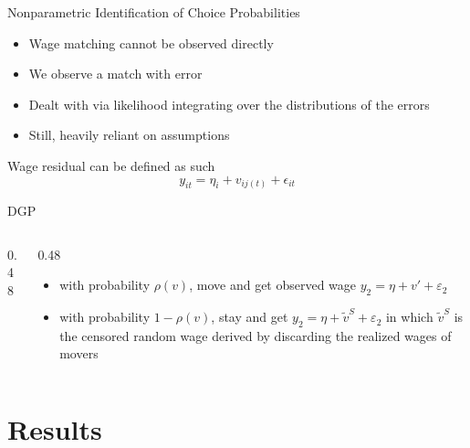 \documentclass[aspectratio=169,professionalfonts]{beamer}
\begin{document}
\begin{frame}{Nonparametric Identification of Choice Probabilities}
  \begin{itemize}
  \item Wage matching cannot be observed directly
  \item We observe a match with error
  \item Dealt with via likelihood integrating over the distributions  of the errors
  \item Still, heavily reliant on assumptions
  \end{itemize}
  Wage residual can be defined as such
  \begin{equation}
    y_{it} = \eta_i + v_{ij(t)}+\epsilon_{it}
  \end{equation}
\end{frame}

\begin{frame}{DGP}
  \begin{columns}[T,onlytextwidth]
    \begin{column}{0.48\linewidth}
    \end{column}
    \begin{column}{0.48\linewidth}
      \begin{itemize}
        \item with probability $\rho(v)$, move and get observed wage $y_2 = \eta + v' + \varepsilon_2$
        \item with probability $1-\rho(v)$, stay and get $y_2 = \eta + \tilde{v}^S + \varepsilon_2$ in which $\tilde{v}^S$ is the censored random wage derived by discarding the realized wages of movers
      \end{itemize}
    \end{column}
  \end{columns}
\end{frame}

\section{Results}
\end{document}
